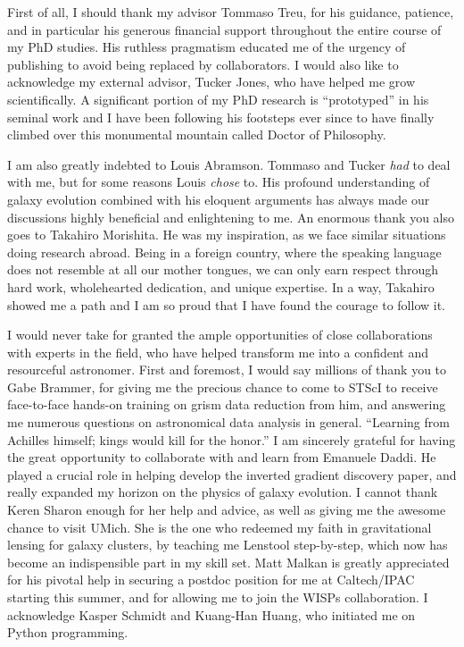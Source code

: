 
First of all, I should thank my advisor Tommaso Treu, for his guidance, patience, and in particular his generous financial
support throughout the entire course of my PhD studies.
His ruthless pragmatism educated me of the urgency of publishing to avoid being replaced by collaborators.
I would also like to acknowledge my external advisor, Tucker Jones, who have helped me grow scientifically.
A significant portion of my PhD research is ``prototyped'' in his seminal work and I have been following his footsteps
ever since to have finally climbed over this monumental mountain called Doctor of Philosophy.

I am also greatly indebted to Louis Abramson. Tommaso and Tucker \emph{had} to deal with me, but for some reasons Louis \emph{chose} to.
His profound understanding of galaxy evolution combined with his eloquent arguments has always made our discussions highly
beneficial and enlightening to me.
An enormous thank you also goes to Takahiro Morishita.
He was my inspiration, as we face similar situations doing research abroad.
Being in a foreign country, where the speaking language does not resemble at all our mother tongues,
we can only earn respect through hard work, wholehearted dedication, and unique expertise.
In a way, Takahiro showed me a path and I am so proud that I have found the courage to follow it.

I would never take for granted the ample opportunities of close collaborations with experts in the field, who have
helped transform me into a confident and resourceful astronomer.
First and foremost, I would say millions of thank you to Gabe Brammer, for giving me the precious chance to come to STScI to
receive face-to-face hands-on training on grism data reduction from him, and answering me numerous questions on
astronomical data analysis in general.  ``Learning from Achilles himself; kings would kill for the honor.'' I am
sincerely grateful for having the great opportunity to collaborate with and learn from Emanuele Daddi.  He played
a crucial role in helping develop the inverted gradient discovery paper, and really expanded my horizon on the
physics of galaxy evolution. I cannot thank Keren Sharon enough for her help and advice, as well as giving me the
awesome chance to visit UMich.  She is the one who redeemed my faith in gravitational lensing
for galaxy clusters, by teaching me Lenstool step-by-step, which now has become an indispensible part in my skill
set.  Matt Malkan is greatly appreciated for his pivotal help in securing a postdoc position for me at
Caltech/IPAC starting this summer, and for allowing me to join the WISPs collaboration.  I acknowledge Kasper
Schmidt and Kuang-Han Huang, who initiated me on Python programming.

